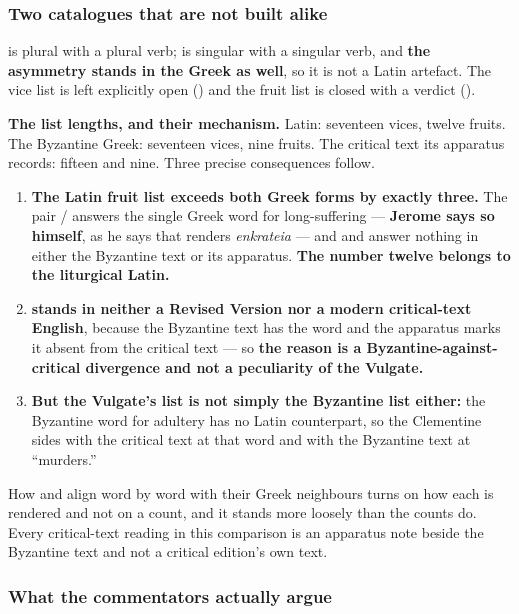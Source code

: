 \subsubsection*{Two catalogues that are not built alike}

 is plural with a plural verb;  is
singular with a singular verb, and \textbf{the asymmetry stands in the Greek as
well}, so it is not a Latin artefact. The vice list is left explicitly open
() and the fruit list is closed with a verdict
().

\textbf{The list lengths, and their mechanism.} Latin: seventeen vices, twelve
fruits. The Byzantine Greek: seventeen vices, nine fruits. The critical text
its apparatus records: fifteen and nine. Three precise consequences follow.

\begin{enumerate}[leftmargin=1.5em, itemsep=0.15em]
\item \textbf{The Latin fruit list exceeds both Greek forms by exactly
three.} The pair / answers the single Greek
word for long-suffering --- \textbf{Jerome says so himself}, as he says that
 renders \emph{enkrateia} --- and  and
 answer nothing in either the Byzantine text or its apparatus.
\textbf{The number twelve belongs to the liturgical Latin.}
\item \textbf{ stands in neither a Revised Version nor a modern
critical-text English}, because the Byzantine text has the word and the
apparatus marks it absent from the critical text --- so \textbf{the reason is a
Byzantine-against-critical divergence and not a peculiarity of the Vulgate.}
\item \textbf{But the Vulgate's list is not simply the Byzantine list either:}
the Byzantine word for adultery has no Latin counterpart, so the Clementine
sides with the critical text at that word and with the Byzantine text at
``murders.''
\end{enumerate}

How  and
 align word by word with their Greek neighbours turns on how
each is rendered and not on a count, and it stands more loosely than the
counts do. Every critical-text reading in this comparison is an apparatus note beside the
Byzantine text and not a critical edition's own text.

\subsubsection*{What the commentators actually argue}

